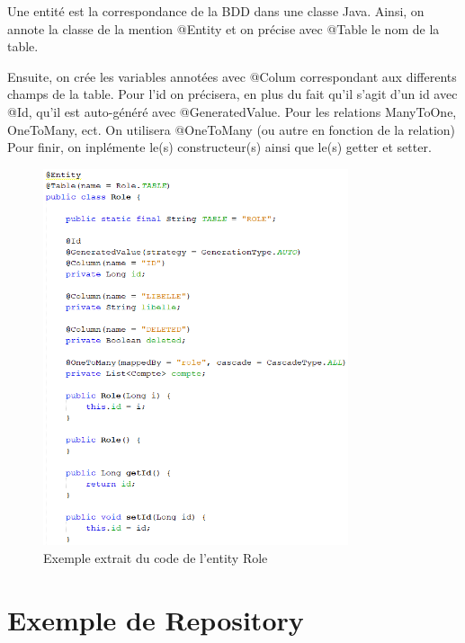 		Une entité est la correspondance de la BDD dans une classe Java. \newline
		Ainsi, on annote la classe de la mention @Entity et on précise avec @Table le nom de la table.

		\newpage
		Ensuite, on crée les variables annotées avec @Colum correspondant aux differents champs de la table. \newline
		Pour l'id on précisera, en plus du fait qu'il s'agit d'un id avec @Id, qu'il est auto-généré avec @GeneratedValue.\newline
		Pour les relations ManyToOne, OneToMany, ect. On utilisera @OneToMany (ou autre en fonction de la relation)\newline
		Pour finir, on inplémente le(s) constructeur(s) ainsi que le(s) getter et setter.

		\begin{figure}[H]
			\centering\includegraphics[width=0.80\textwidth, keepaspectratio]{res/entity.png}
			\caption{Exemple extrait du code de l'entity Role}
		\end{figure}

	\newpage
	\section{Exemple de Repository}

